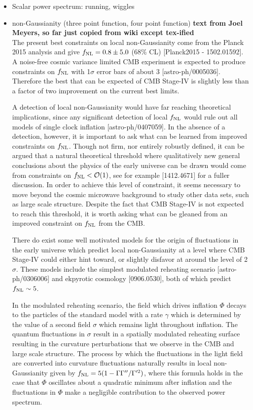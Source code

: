 \begin{itemize}
\item Scalar power spectrum: running, wiggles
\item non-Gaussianity (three point function, four point function)
{\bf text from Joel Meyers, so far just copied from wiki except tex-ified} \\
The present best constraints on local non-Gaussianity come from the Planck 2015 analysis and give $f_{\rm NL} = 0.8 \pm 5.0$ (68\% CL) [Planck2015 - 1502.01592]. A noise-free cosmic variance limited CMB experiment is expected to produce constraints on $f_{\rm NL}$ with 1$\sigma$ error bars of about 3 [astro-ph/0005036]. Therefore the best that can be expected of CMB Stage-IV is slightly less than a factor of two improvement on the current best limits.

A detection of local non-Gaussianity would have far reaching theoretical implications, since any significant detection of local $f_{\rm NL}$ would rule out all models of single clock inflation [astro-ph/0407059]. In the absence of a detection, however, it is important to ask what can be learned from improved constraints on $f_{\rm NL}$. Though not firm, nor entirely robustly defined, it can be argued that a natural theoretical threshold where qualitatively new general conclusions about the physics of the early universe can be drawn would come from constraints on $f_{\rm NL}<\mathcal{O}(1)$, see for example [1412.4671] for a fuller discussion. In order to achieve this level of constraint, it seems necessary to move beyond the cosmic microwave background to study other data sets, such as large scale structure. Despite the fact that CMB Stage-IV is not expected to reach this threshold, it is worth asking what can be gleaned from an improved constraint on $f_{\rm NL}$ from the CMB.

There do exist some well motivated models for the origin of fluctuations in the early universe which predict local non-Gaussianity at a level where CMB Stage-IV could either hint toward, or slightly disfavor at around the level of 2$\sigma$. These models include the simplest modulated reheating scenario [astro-ph/0306006] and ekpyrotic cosmology [0906.0530], both of which predict $f_{\rm NL}\sim5$.

In the modulated reheating scenario, the field which drives inflation $\Phi$ decays to the particles of the standard model with a rate $\gamma$ which is determined by the value of a second field $\sigma$ which remains light throughout inflation. The quantum fluctuations in $\sigma$ result in a spatially modulated reheating surface resulting in the curvature perturbations that we observe in the CMB and large scale structure. The process by which the fluctuations in the light field are converted into curvature fluctuations naturally results in local non-Gaussianity given by $f_{\rm NL} = 5(1-\Gamma \Gamma^{\prime\prime}/\Gamma^{\prime2})$, where this formula holds in the case that $\Phi$ oscillates about a quadratic minimum after inflation and the fluctuations in $\Phi$ make a negligible contribution to the observed power spectrum.


\end{itemize}
